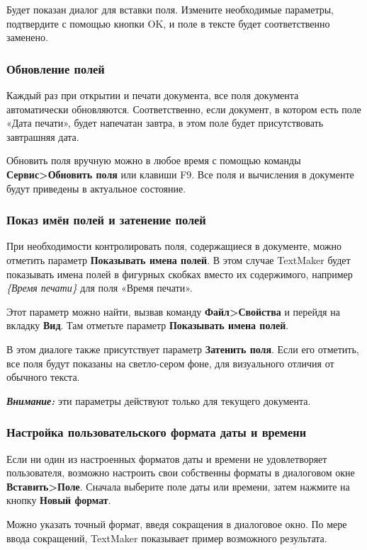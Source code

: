 ﻿\documentclass[a4paper,10pt]{article}
\begin{document}
Будет показан диалог для вставки поля. Измените необходимые параметры, подтвердите с помощью кнопки OK, и поле в тексте будет соответственно заменено.

\subsubsection{Обновление полей}

Каждый раз при открытии и печати документа, все поля документа автоматически обновляются. Соответственно, если документ, в котором есть поле «Дата печати», будет напечатан завтра, в этом поле будет присутствовать завтрашняя дата.

Обновить поля вручную можно в любое время с помощью команды \textbf{Сервис>Обновить поля} или клавиши F9. Все поля и вычисления в документе будут приведены в актуальное состояние.

\subsubsection{Показ имён полей и затенение полей}
При необходимости контролировать поля, содержащиеся в документе, можно отметить параметр \textbf{Показывать имена полей}. В этом случае TextMaker будет показывать имена полей в фигурных скобках вместо их содержимого, например \textit{\{Время печати\}} для поля «Время печати».

Этот параметр можно найти, вызвав команду \textbf{Файл>Свойства} и перейдя на вкладку \textbf{Вид}. Там отметьте параметр \textbf{Показывать имена полей}.

В этом диалоге также присутствует параметр \textbf{Затенить поля}. Если его отметить, все поля будут показаны на светло-сером фоне, для визуального отличия от обычного текста.

\textit{\textbf{Внимание:}} эти параметры действуют только для текущего документа.

\subsubsection{Настройка пользовательского формата даты и времени}
Если ни один из настроенных форматов даты и времени не удовлетворяет пользователя, возможно настроить свои собственны форматы в диалоговом окне \textbf{Вставить>Поле}. Сначала выберите поле даты или времени, затем нажмите на кнопку \textbf{Новый формат}.

Можно указать точный формат, введя сокращения в диалоговое окно. По мере ввода сокращений, TextMaker показывает пример возможного результата.
\end{document}

